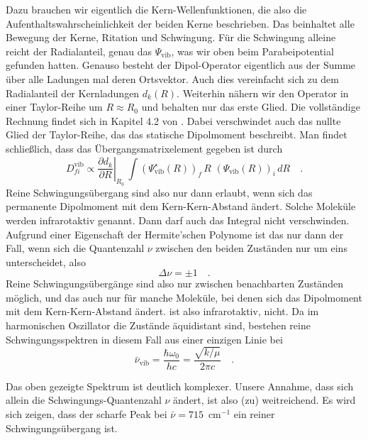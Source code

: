 Dazu brauchen wir eigentlich  die Kern-Wellenfunktionen, die also die Aufenthaltswahrscheinlichkeit der beiden Kerne beschrieben. Das beinhaltet alle Bewegung der Kerne, Ritation und Schwingung. Für die Schwingung alleine reicht der Radialanteil, genau das $\Psi_\text{vib}$, was wir oben beim Parabeipotential gefunden hatten.
 Genauso besteht der Dipol-Operator eigentlich aus der Summe über alle Ladungen mal deren Ortsvektor. Auch dies vereinfacht sich zu dem Radialanteil der Kernladungen $d_k(R)$. Weiterhin nähern wir den Operator in einer Taylor-Reihe um $R \approx R_0$ und behalten nur das erste Glied. Die vollständige Rechnung findet sich in Kapitel 4.2 von \cite{Demtröder_molekuelphysik}. Dabei verschwindet auch das nullte Glied der Taylor-Reihe, das das statische Dipolmoment beschreibt. Man findet schließlich, dass das Übergangsmatrixelement gegeben ist durch
\begin{equation}
D_{fi}^\text{vib} \propto  \left. \frac{\partial d_k}{\partial R} \right|_{R_0} \,  \int (\Psi_\text{vib}^\star (R) )_f \, R  \, \, (\Psi_\text{vib} (R) )_i \, dR \quad .
\end{equation}
Reine Schwingungsübergang sind also nur dann erlaubt, wenn sich das permanente Dipolmoment mit dem Kern-Kern-Abstand ändert. Solche Moleküle werden infrarotaktiv genannt. Dann  darf auch das Integral nicht verschwinden. Aufgrund einer Eigenschaft der Hermite'schen Polynome ist das nur dann der Fall, wenn sich die Quantenzahl $\nu$ zwischen den beiden Zuständen nur um eins unterscheidet, also 
\begin{equation}
 \Delta \nu = \pm 1 \quad .
\end{equation}
Reine Schwingungsübergänge sind also nur zwischen benachbarten Zuständen möglich, und das auch nur für manche Moleküle, bei denen sich das Dipolmoment mit dem Kern-Kern-Abstand ändert.  ist also infrarotaktiv,  nicht. Da im harmonischen Oszillator die Zustände äquidistant sind, bestehen reine Schwingungsspektren in diesem Fall aus einer einzigen Linie bei 
\begin{equation}
 \bar{\nu}_\text{vib} = \frac{\hbar \omega_0}{h c} = \frac{\sqrt{k / \mu} }{2 \pi  c} \quad .
\end{equation}

Das oben gezeigte Spektrum ist deutlich komplexer. Unsere Annahme, dass sich allein die Schwingungs-Quantenzahl $\nu$ ändert, ist also (zu) weitreichend. Es wird sich zeigen, dass der scharfe Peak bei $\bar{\nu} = 715$~cm$^{-1}$ ein reiner Schwingungsübergang ist.

